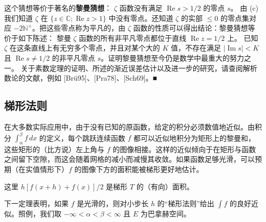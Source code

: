 \begin{remark}
\begin{items}
这个猜想等价于著名的\textbf{黎曼猜想}：
$ \zeta $ 函数没有满足 $ \operatorname{Re} s > 1/2 $ 的零点 $ s $。
由 (c) 我们知道 $ \zeta $ 在 $ \{ z \in \mathbb{C} ; \operatorname{Re} z > 1 \} $ 中没有零点。还知道 $ \zeta $ 的实部 $ \le 0 $ 的零点集对应 $ -2\mathbb{N}^\times $。把这些零点称为平凡的，由 $ \zeta $ 函数的性质可以得出结论：黎曼猜想等价于如下陈述：
黎曼 $ \zeta $ 函数的所有非平凡零点都位于直线 $ \operatorname{Re} z = 1/2 $ 上。
已知 $ \zeta $ 在这条直线上有无穷多个零点，并且对某个大的 $ K $ 值，不存在满足 $ |\operatorname{Im} s| < K $ 且 $ \operatorname{Re} s \ne 1/2 $ 的非平凡零点 $ s $。证明黎曼猜想至今仍是数学中最重大的努力之一。
关于素数定理的证明、所述的渐近误差估计以及进一步的研究，请查阅解析数论的文献，例如 [Brü95]、[Pra78]、[Sch69]。\nobreak\hspace{0.35em}■

\end{items}

\end{remark}

\subsection*{梯形法则}

在大多数实际应用中，由于没有已知的原函数，给定的积分必须数值地近似。由积分 $ \int_\alpha^\beta f\,dx $ 的定义，每个跳跃连续函数 $ f $ 都可以近似地积分为矩形上的黎曼和，这些矩形的（比方说）左上角与 $ f $ 的图像相接。这样的近似倾向于在矩形与函数之间留下空隙，而这会随着网格的减小而减慢其收敛。如果函数足够光滑，可以预期（在实值情形下）$ f $ 的图像下方的面积能被梯形更好地估计。


这里 $ h[f(x + h) + f(x)]/2 $ 是梯形 $ T $ 的（有向）面积。

下一定理表明，如果 $ f $ 是光滑的，则对小步长 $ h $ 的“梯形法则”给出 $ \int f $ 的良好近似。照例，我们取 $ -\infty < \alpha < \beta < \infty $ 且 $ E $ 为巴拿赫空间。

